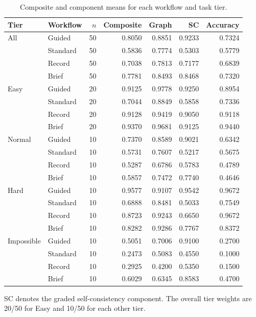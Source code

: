 \begin{table}[!htbp]
\centering
\small
\caption{Composite and component means for each workflow and task tier.}
\label{tab:si-arm-tier}
\begin{tabular}{llrrrrr}
\toprule
Tier & Workflow & $n$ & Composite & Graph & SC & Accuracy \\
\midrule
All & Guided & 50 & 0.8050 & 0.8851 & 0.9233 & 0.7324 \\
 & Standard & 50 & 0.5836 & 0.7774 & 0.5303 & 0.5779 \\
 & Record & 50 & 0.7038 & 0.7813 & 0.7177 & 0.6839 \\
 & Brief & 50 & 0.7781 & 0.8493 & 0.8468 & 0.7320 \\
\addlinespace
Easy & Guided & 20 & 0.9125 & 0.9778 & 0.9250 & 0.8954 \\
 & Standard & 20 & 0.7044 & 0.8849 & 0.5858 & 0.7336 \\
 & Record & 20 & 0.9128 & 0.9419 & 0.9050 & 0.9118 \\
 & Brief & 20 & 0.9370 & 0.9681 & 0.9125 & 0.9440 \\
\addlinespace
Normal & Guided & 10 & 0.7370 & 0.8589 & 0.9021 & 0.6342 \\
 & Standard & 10 & 0.5731 & 0.7607 & 0.5217 & 0.5675 \\
 & Record & 10 & 0.5287 & 0.6786 & 0.5783 & 0.4789 \\
 & Brief & 10 & 0.5857 & 0.7472 & 0.7740 & 0.4646 \\
\addlinespace
Hard & Guided & 10 & 0.9577 & 0.9107 & 0.9542 & 0.9672 \\
 & Standard & 10 & 0.6888 & 0.8481 & 0.5033 & 0.7549 \\
 & Record & 10 & 0.8723 & 0.9243 & 0.6650 & 0.9672 \\
 & Brief & 10 & 0.8282 & 0.9286 & 0.7767 & 0.8372 \\
\addlinespace
Impossible & Guided & 10 & 0.5051 & 0.7006 & 0.9100 & 0.2700 \\
 & Standard & 10 & 0.2473 & 0.5083 & 0.4550 & 0.1000 \\
 & Record & 10 & 0.2925 & 0.4200 & 0.5350 & 0.1500 \\
 & Brief & 10 & 0.6029 & 0.6345 & 0.8583 & 0.4700 \\
\bottomrule
\end{tabular}
\par\smallskip\begin{minipage}{\linewidth}\footnotesize SC denotes the graded self-consistency component. The overall tier weights are 20/50 for Easy and 10/50 for each other tier.\end{minipage}
\end{table}

